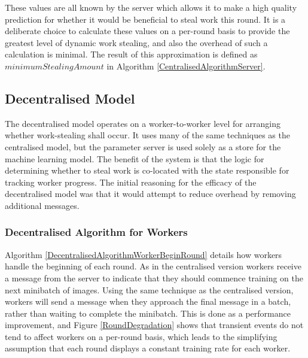 \documentclass[12pt]{article}
\begin{document}
These values are all known by the server which allows it to make a high quality prediction for whether it would be beneficial to steal work this round. It is a deliberate choice to calculate these values on a per-round basis to provide the greatest level of dynamic work stealing, and also the overhead of such a calculation is minimal. The result of this approximation is defined as $minimumStealingAmount$ in Algorithm \ref{CentralisedAlgorithmServer}.

\subsection{Decentralised Model}
The decentralised model operates on a worker-to-worker level for arranging whether work-stealing shall occur. It uses many of the same techniques as the centralised model, but the parameter server is used solely as a store for the machine learning model.
\newline
\newline
The benefit of the system is that the logic for determining whether to steal work is co-located with the state responsible for tracking worker progress. The initial reasoning for the efficacy of the decentralised model was that it would attempt to reduce overhead by removing additional messages.

\subsubsection{Decentralised Algorithm for Workers}

Algorithm \ref{DecentralisedAlgorithmWorkerBeginRound} details how workers handle the beginning of each round. As in the centralised version workers receive a  message from the server to indicate that they should commence training on the next minibatch of images.
\newline
\newline
Using the same technique as the centralised version, workers will send a message when they approach the final message in a batch, rather than waiting to complete the minibatch. This is done as a performance improvement, and Figure \ref{RoundDegradation} shows that transient events do not tend to affect workers on a per-round basis, which leads to the simplifying assumption that each round displays a constant training rate for each worker.
\end{document}
